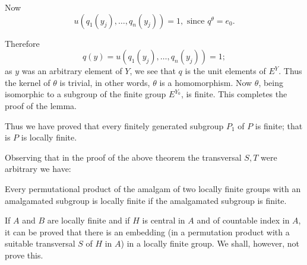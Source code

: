 Now 
$$
u(q_1(y_j),\ldots,q_n(y_j))=1, \text{ since } q^\theta =e_0.
$$

Therefore\pageoriginale
$$
q(y)=u(q_1(y_j),\ldots,q_n(y_j))=1;
$$
as $y$ was an arbitrary element of $Y$, we see that $q$ is the unit
elements of $E^Y$. Thus the kernel of $\theta$ is trivial, in other
words, $\theta$ is a homomorphism. Now $\theta$, being isomorphic to a
subgroup of the finite group $E^{Y_0}$, is finite. This completes the
proof of the lemma. 

Thus we have proved that every finitely generated subgroup $P_1$ of
$P$ is finite; that is $P$ is locally finite. 

Observing that in the proof of the above theorem the transversal $S,T$
were arbitrary we have: 
\begin{coro*}
  Every permutational product of the amalgam of two locally finite
  groups with an amalgamated subgroup is locally finite if the
  amalgamated subgroup is finite. 
\end{coro*}

If $A$ and $B$ are locally finite and if $H$ is central in $A$ and of
countable index in $A$, it can be proved that there is an embedding
(in a permutation product with a suitable transversal $S$ of $H$ in
$A$) in a locally finite group. We shall, however, not prove this. 

